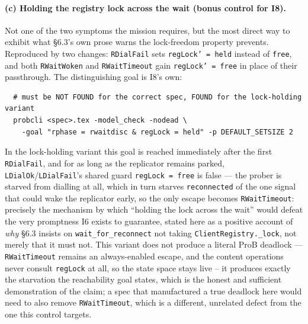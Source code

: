 \documentclass[a4paper,10pt,fleqn]{article}
\begin{document}
\paragraph{(c) Holding the registry lock across the wait (bonus control
for I8).} Not one of the two symptoms the mission requires, but the most
direct way to exhibit what \S6.3's own prose warns the lock-freedom
property prevents.  Reproduced by two changes: \texttt{RDialFail} sets
\texttt{regLock' = held} instead of \texttt{free}, and both
\texttt{RWaitWoken} and \texttt{RWaitTimeout} gain \texttt{regLock' = free}
in place of their passthrough. The distinguishing goal is I8's own:
\begin{verbatim}
  # must be NOT FOUND for the correct spec, FOUND for the lock-holding variant
  probcli <spec>.tex -model_check -nodead \
    -goal "rphase = rwaitdisc & regLock = held" -p DEFAULT_SETSIZE 2
\end{verbatim}
In the lock-holding variant this goal is reached immediately after the
first \texttt{RDialFail}, and for as long as the replicator remains
parked, \texttt{LDialOk}/\texttt{LDialFail}'s shared guard
\texttt{regLock = free} is false --- the prober is starved from dialling at
all, which in turn starves \texttt{reconnected} of the one signal that
could wake the replicator early, so the only escape becomes
\texttt{RWaitTimeout}: precisely the mechanism by which ``holding the lock
across the wait'' would defeat the very promptness I6 exists to guarantee,
stated here as a positive account of \emph{why} \S6.3 insists on
\texttt{wait\_for\_reconnect} not taking \texttt{ClientRegistry.\_lock},
not merely that it must not. This variant does not produce a literal ProB
deadlock --- \texttt{RWaitTimeout} remains an always-enabled escape, and
the content operations never consult \texttt{regLock} at all, so the state
space stays live -- it produces exactly the starvation the reachability
goal states, which is the honest and sufficient demonstration of the
claim; a spec that manufactured a true deadlock here would need to also
remove \texttt{RWaitTimeout}, which is a different, unrelated defect from
the one this control targets.
\end{document}
